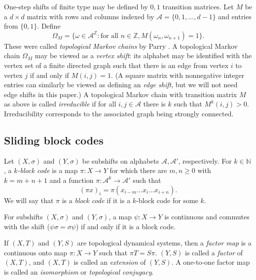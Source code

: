 \documentclass{kepart2010}
\theoremstyle{plain}
\theoremstyle{definition}
\theoremstyle{remark}
\theoremstyle{definition}
\numberwithin{equation}{section}
\begin{document}
One-step shifts of finite type may be defined by $0,1$ transition
matrices. Let $M$ be a $d \times d$ matrix with rows and columns
indexed by ${{\mathcal A}}=\{0,1,\dots,d-1\}$ and entries from $\{0,1\}$.
Define
 \begin{equation}\label{sft}
 \Omega_M=\{\omega \in {{\mathcal A}}^{\mathbb Z}: \text{for all  } n\in {\mathbb Z},
 M(\omega_n,\omega_{n+1})=1\}.
 \end{equation}
 These were called {\em topological
Markov chains} by Parry \cite{Parry1964}. A topological Markov
chain  $ \Omega_M$ may be viewed as a {\it vertex shift}:
its alphabet may be identified with the vertex set of a
 finite directed graph such that  there is an edge from
vertex $i$ to vertex $j$ if and only if $M(i,j)=1$. (A square matrix
with nonnegative integer entries can similarly be viewed as defining
an {\it edge shift}, but we will not need edge shifts in this
paper.) A topological Markov chain with transition matrix $M$ as
above is called {\em irreducible} if for all $i,j \in {{\mathcal A}}$ there is
$k$ such that $M^k(i,j)>0$. Irreducibility corresponds to the
associated graph being strongly connected.

\subsection{Sliding block codes}\label{sec_codes}

Let $(X,\sigma)$ and $(Y,\sigma)$ be subshifts on alphabets
${{\mathcal A}},{{\mathcal A}}'$, respectively. For $k \in {\mathbb N}$, a {\em $k$-block code} is
a map $\pi: X \to Y$ for which there are $m,n \geq 0$ with $k=m+n+1$
and a function $\pi:{{\mathcal A}}^k \to {{\mathcal A}}'$ such that \begin{equation} (\pi x)_i =
\pi(x_{i-m} \dots x_i \dots x_{i+n}). \end{equation} We will say that $\pi$ is
a {\em block code} if it is a $k$-block code for some $k$.

\begin{thm} For subshifts $(X,\sigma)$ and
$(Y,\sigma)$, a map $\psi : X \to Y$ is continuous and commutes with
the shift
($\psi\sigma=\sigma\psi$) if and only if it is a block code.
\end{thm}

If $(X,T)$ and $(Y,S)$ are topological dynamical systems,
 then a {\em factor map} is a continuous onto map $\pi :X \to Y$
such that $\pi T=S \pi$. $(Y,S)$ is called a {\em factor} of
$(X,T)$, and $(X,T)$ is called an {\em extension} of $(Y,S)$. A
one-to-one factor map is called an {\em isomorphism} or {\em
topological conjugacy}.
\end{document}

